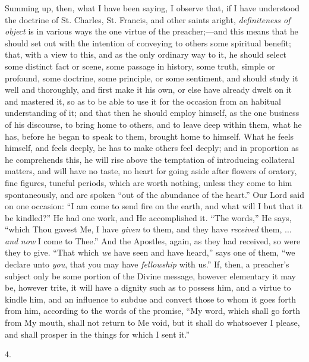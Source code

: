 Summing up, then, what I have been saying, I observe that, if I
have understood the doctrine of St. Charles, St. Francis, and other
saints aright, \emph{definiteness of object} is in various ways the
one virtue of the preacher;—and this means that he should set out
with the intention of conveying to others some spiritual benefit;
that, with a view to this, and as the only ordinary way to it, he
should select some distinct fact or scene, some passage in history,
some truth, simple or profound, some doctrine, some principle, or some
sentiment, and should study it well and thoroughly, and first make it
his own, or else have already dwelt on it and mastered it, so as
to be able to use it for the occasion from an habitual understanding
of it; and that then he should employ himself, as the one business of
his discourse, to bring home to others, and to leave deep within them,
what he has, before he began to speak to them, brought home to
himself. What he feels himself, and feels deeply, he has to make
others feel deeply; and in proportion as he comprehends this, he will
rise above the temptation of introducing collateral matters, and will
have no taste, no heart for going aside after flowers of oratory, fine
figures, tuneful periods, which are worth nothing, unless they come to
him spontaneously, and are spoken ``out of the abundance of the
heart.'' Our Lord said on one occasion: ``I am come to send
fire on the earth, and what will I but that it be kindled?'' He
had one work, and He accomplished it. ``The words,'' He says,
``which Thou gavest Me, I have \emph{given} to them, and they have
\emph{received} them, ... \emph{and} \emph{now} I come to Thee.''
And the Apostles, again, as they had received, so were they to give.
``That which \emph{we} have seen and have heard,'' says one of
them, ``we declare unto \emph{you}, that you may have \emph{fellowship}
with us.'' If, then, a preacher's subject only be some portion of
the Divine message, however elementary it may be, however trite, it
will have a dignity such as to possess him, and a virtue to kindle
him, and an influence to subdue and convert those to whom it goes
forth from him, according to the words of the promise, ``My word,
which shall go forth from My mouth, shall not return to Me void, but
it shall do whatsoever I please, and shall prosper in the things for
which I sent it.''

4.

